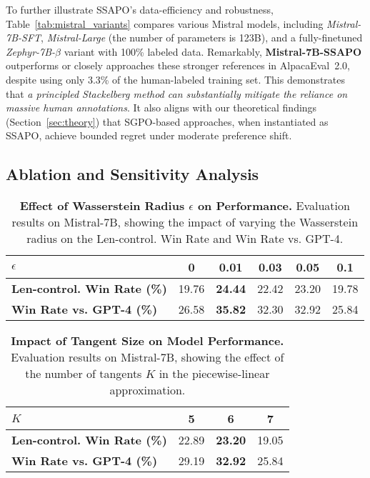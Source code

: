 To further illustrate SSAPO’s data-efficiency and robustness, Table~\ref{tab:mistral_variants} compares various Mistral models, including \emph{Mistral-7B-SFT}, \emph{Mistral-Large} (the number of parameters is 123B), and a fully-finetuned \emph{Zephyr-7B-$\beta$} variant with 100\% labeled data. Remarkably, \textbf{Mistral-7B-SSAPO} outperforms or closely approaches these stronger references in AlpacaEval~2.0, despite using only 3.3\% of the human-labeled training set. This demonstrates that \emph{a principled Stackelberg method can substantially mitigate the reliance on massive human annotations}. It also aligns with our theoretical findings (Section~\ref{sec:theory}) that SGPO-based approaches, when instantiated as SSAPO, achieve bounded regret under moderate preference shift.

\subsection{Ablation and Sensitivity Analysis}
\label{subsec:ablation_sensitivity}
\begin{table}[h]
\centering
\caption{\textbf{Effect of Wasserstein Radius $\epsilon$ on Performance.} Evaluation results on Mistral-7B, showing the impact of varying the Wasserstein radius on the Len-control. Win Rate and Win Rate vs. GPT-4.}
\begin{tabular}{lccccc}
\toprule
$\epsilon$ & 0 & 0.01 & 0.03 & 0.05 & 0.1 \\
\midrule
\textbf{Len-control. Win Rate (\%)} & 19.76 & \textbf{24.44} & 22.42 & 23.20 & 19.78 \\
\textbf{Win Rate vs. GPT-4 (\%)} & 26.58 & \textbf{35.82} & 32.30 & 32.92 & 25.84 \\
\bottomrule
\end{tabular}
\label{tab:wasserstein-radius}
\end{table}

\begin{table}[h]
\centering
\caption{\textbf{Impact of Tangent Size on Model Performance.} Evaluation results on Mistral-7B, showing the effect of the number of tangents $K$ in the piecewise-linear approximation.}
\begin{tabular}{lccc}
\toprule
$K$ & 5 & 6 & 7  \\
\midrule
\textbf{Len-control. Win Rate (\%)} & 22.89 & \textbf{23.20} & 19.05 \\
\textbf{Win Rate vs. GPT-4 (\%)} & 29.19 & \textbf{32.92} & 25.84\\
\bottomrule
\end{tabular}
\label{tab:num-tangents}
\end{table}

